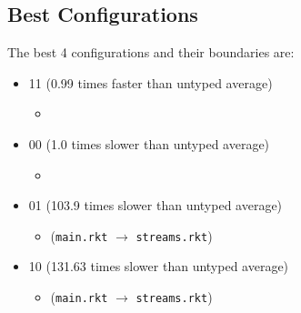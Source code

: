 \documentclass{article}
\newcommand{\mono}[1]{\texttt{#1}}
\begin{document}
\subsection{Best Configurations}
The best 4 configurations and their boundaries are:
\begin{itemize}
\item 11 (0.99 times faster than untyped average)
  \begin{itemize}
  \item 
  \end{itemize}
\item 00 (1.0 times slower than untyped average)
  \begin{itemize}
  \item 
  \end{itemize}
\item 01 (103.9 times slower than untyped average)
  \begin{itemize}
  \item (\mono{main.rkt} $\rightarrow$ \mono{streams.rkt})
  \end{itemize}
\item 10 (131.63 times slower than untyped average)
  \begin{itemize}
  \item (\mono{main.rkt} $\rightarrow$ \mono{streams.rkt})
  \end{itemize}


\end{itemize}
\end{document}
